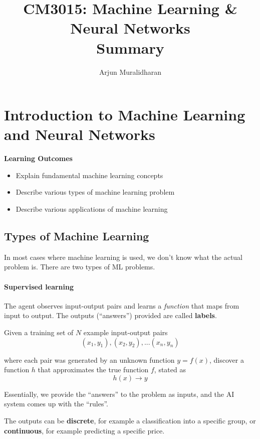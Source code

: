 \title{CM3015: Machine Learning \& Neural Networks \\ Summary}
\author{Arjun Muralidharan}



\section{Introduction to Machine Learning and Neural Networks}
\begin{mdframed}
\textbf{Learning Outcomes}
\begin{itemize}[label={\checkmark}]
\item Explain fundamental machine learning concepts
\item Describe various types of machine learning problem
\item Describe various applications of machine learning
\end{itemize}
\end{mdframed}

\subsection{Types of Machine Learning}

In most cases where machine learning is used, we don't know what the actual problem is. There are two types of ML problems.

\paragraph{Supervised learning} The agent observes input-output pairs and learns a \textit{function} that maps from input to output. The outputs (``answers'') provided are called \textbf{labels}.

Given a training set of \(N\) example input-output pairs
\[
(x_1, y_1),(x_2, y_2),...(x_n, y_n)
\]

where each pair was generated by an unknown function \(y = f(x)\), discover a function \(h\) that approximates the true function \(f\), stated as 
\[
h(x) \rightarrow y    
\]


Essentially, we provide the ``answers'' to the problem as inputs, and the AI system comes up with the ``rules''.

The outputs can be \textbf{discrete}, for example a classification into a specific group, or \textbf{continuous}, for example predicting a specific price.

